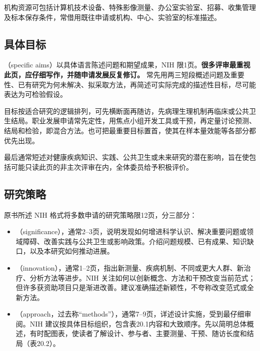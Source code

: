 机构资源可包括计算机技术设备、特殊影像测量、办公室实验室、招募、收集管理及标本保存条件，常借用既往申请或机构、中心、实验室的标准描述。

\subsection{具体目标}
（specific aims）以具体语言陈述问题和期望成果，NIH 限1页。\textbf{很多评审最重视此页，应仔细写作，并随申请发展反复修订。}
常先用两三短段概述问题及重要性、已有研究为何未解决、拟采取方法，再简述可实际完成的描述性目标，尽可能表达为可检验假设。

目标按适合研究的逻辑排列，可先横断面再随访，先病理生理机制再临床或公共卫生结局。职业发展申请常先定性，用焦点小组开发工具或干预，再定量讨论预测、结局和检验，即混合方法。也可把最重要目标置首，使其在样本量效能等各部分都优先出现。

最后通常短述对健康疾病知识、实践、公共卫生或未来研究的潜在影响，旨在使包括可能只读此页的非主次评审在内，全体委员给予积极评价。

\subsection{研究策略}
原书所述 NIH 格式将多数申请的研究策略限12页，分三部分：
\begin{itemize}
\item {}（significance），通常2--3页，说明发现如何增进科学认识、解决重要问题或领域障碍、改善实践与公共卫生或影响政策。介绍问题规模、已有成果、知识缺口，以及本研究如何推动进展。
\item {}（innovation），通常1--2页，指出新测量、疾病机制、不同或更大人群、新治疗、分析方法等进步。NIH 关注如何以创新概念、方法和干预改变当前范式；但许多获资助项目只是渐进改善。建议准确描述新颖性，不夸称改变范式或全新方法。
\item {}（approach，过去称“methods”），通常7--9页，详述设计实施，受到最仔细审阅。NIH 建议按具体目标组织，包含表20.1内容和大致顺序。先以简明总体概述，有时配图表，使读者了解设计、参与者、主要测量、干预、随访长度和结局（表20.2）。
\end{itemize}

